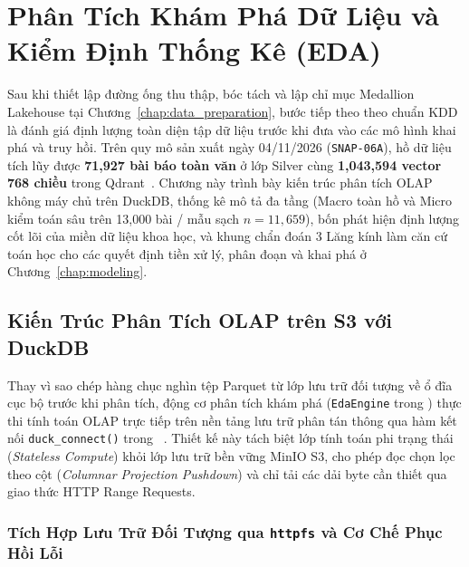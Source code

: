 
\chapter{Phân Tích Khám Phá Dữ Liệu và Kiểm Định Thống Kê (EDA)}
\label{chap:data_understanding}

Sau khi thiết lập đường ống thu thập, bóc tách và lập chỉ mục Medallion Lakehouse tại Chương~\ref{chap:data_preparation}, bước tiếp theo theo chuẩn KDD là đánh giá định lượng toàn diện tập dữ liệu trước khi đưa vào các mô hình khai phá và truy hồi. Trên quy mô sản xuất ngày 04/11/2026 (\texttt{SNAP-06A}), hồ dữ liệu tích lũy được \textbf{71,927 bài báo toàn văn} ở lớp Silver cùng \textbf{1,043,594 vector 768 chiều} trong Qdrant~\cite{qdrant2023vector}. Chương này trình bày kiến trúc phân tích OLAP không máy chủ trên DuckDB, thống kê mô tả đa tầng (Macro toàn hồ và Micro kiểm toán sâu trên 13,000 bài / mẫu sạch $n = 11,659$), bốn phát hiện định lượng cốt lõi của miền dữ liệu khoa học, và khung chẩn đoán 3 Lăng kính làm căn cứ toán học cho các quyết định tiền xử lý, phân đoạn và khai phá ở Chương~\ref{chap:modeling}.

\section{Kiến Trúc Phân Tích OLAP trên S3 với DuckDB}
\label{sec:ch3_duckdb_olap}

Thay vì sao chép hàng chục nghìn tệp Parquet từ lớp lưu trữ đối tượng về ổ đĩa cục bộ trước khi phân tích, động cơ phân tích khám phá (\texttt{EdaEngine} trong ) thực thi tính toán OLAP trực tiếp trên nền tảng lưu trữ phân tán thông qua hàm kết nối \texttt{duck\_connect()} trong ~\cite{raasveldt2019duckdb,minio2023storage}. Thiết kế này tách biệt lớp tính toán phi trạng thái (\textit{Stateless Compute}) khỏi lớp lưu trữ bền vững MinIO S3, cho phép đọc chọn lọc theo cột (\textit{Columnar Projection Pushdown}) và chỉ tải các dải byte cần thiết qua giao thức HTTP Range Requests.

\subsection{\texorpdfstring{Tích Hợp Lưu Trữ Đối Tượng qua \texttt{httpfs} và Cơ Chế Phục Hồi Lỗi}{Tich Hop Luu Tru Doi Tuong qua httpfs va Co Che Phuc Hoi Loi}}
\label{sec:ch3_httpfs}

